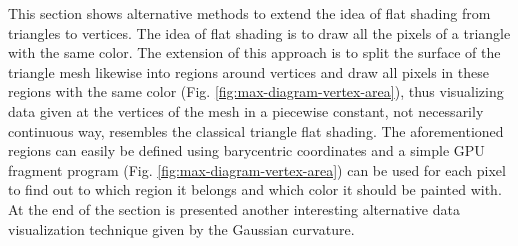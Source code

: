 \label{section:vertex-area-chapter}
This section shows alternative methods to extend the idea of flat shading from triangles to vertices. The idea of flat shading is to draw all the pixels of a triangle with the same color. The extension of this approach is to split the surface of the triangle mesh likewise into regions around vertices and draw all pixels in these regions with the same color (Fig. \ref{fig:max-diagram-vertex-area}), thus visualizing data given at the vertices of the mesh in a piecewise constant, not necessarily continuous way, resembles the classical triangle flat shading. The aforementioned regions can easily be defined using barycentric coordinates and a simple GPU fragment program (Fig. \ref{fig:max-diagram-vertex-area}) can be used for each pixel to find out to which region it belongs and which color it should be painted with. At the end of the section is presented another interesting alternative data visualization technique given by the Gaussian curvature.



